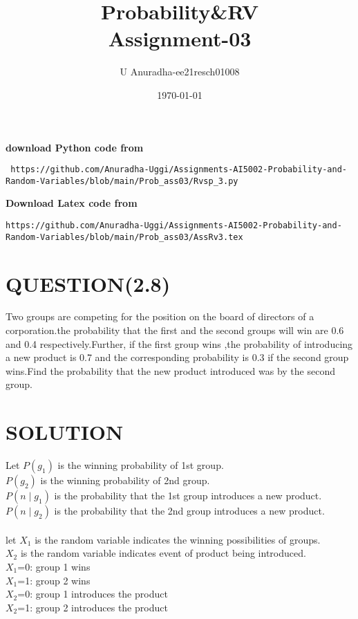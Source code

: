 \documentclass[journal,12pt,twocolumn]{IEEEtran}
\title{Probability\&RV \\ Assignment-03}
\author{U Anuradha-ee21resch01008}
\date{\today}
\begin{document}
\maketitle
\newpage
\bigskip
\renewcommand{\thefigure}{\theenumi}
\renewcommand{\thetable}{\theenumi}
\textbf{download Python code from}
\begin{lstlisting}
 https://github.com/Anuradha-Uggi/Assignments-AI5002-Probability-and-Random-Variables/blob/main/Prob_ass03/Rvsp_3.py
\end{lstlisting}
\textbf{Download Latex code from}
\begin{lstlisting}
https://github.com/Anuradha-Uggi/Assignments-AI5002-Probability-and-Random-Variables/blob/main/Prob_ass03/AssRv3.tex
\end{lstlisting}
\section{QUESTION(2.8)}
Two groups are competing for the position on the board of directors of a corporation.the probability that the first and the second groups will win are 0.6 and 0.4 respectively.Further, if the first group wins ,the probability of introducing a new product is 0.7 and the corresponding probability is 0.3 if the second group wins.Find the probability that the new product introduced was by the second group.
\section{SOLUTION}
Let $P(g_1)$ is the winning probability of 1st group.\\
    $P(g_2)$ is the winning probability of 2nd group.\\
    $P(n\mid g_1)$ is the probability that the 1st group introduces a new product.\\
    $P(n\mid g_2)$ is the probability that the 2nd group introduces a new product.\\ \\
    let  $X_1$ is the random variable indicates the winning possibilities of groups.\\ 
    $X_2$ is the random variable indicates event of product being introduced.\\
    $X_1$=0: group 1 wins\\
    $X_1$=1: group 2 wins\\
    $X_2$=0: group 1 introduces the product\\
    $X_2$=1: group 2 introduces the product\\
    
\end{document}
